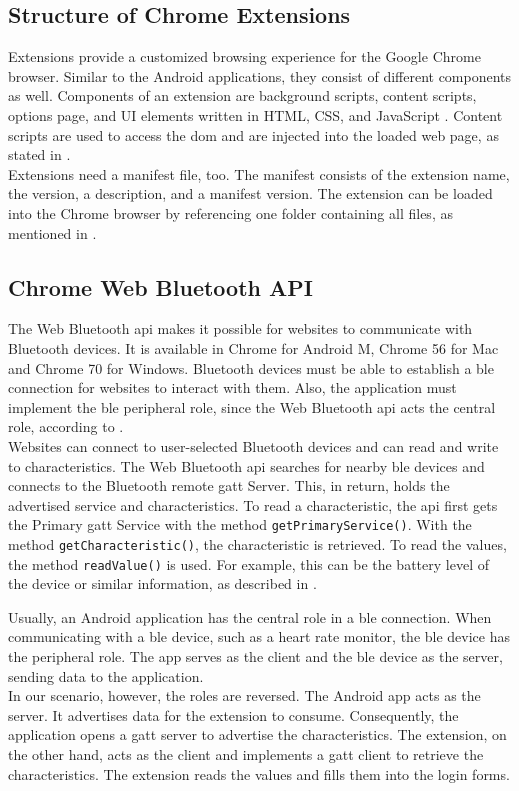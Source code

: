\subsection{Structure of Chrome Extensions}
Extensions provide a customized browsing experience for the Google Chrome browser. Similar to the Android applications, they consist of different components as well. Components of an extension are background scripts, content scripts, options page, and UI elements written in HTML, CSS, and JavaScript \cite{Extensions}. Content scripts are used to access the \gls{dom} and are injected into the loaded web page, as stated in \cite{LiuZYC12}. \\
Extensions need a manifest file, too. The manifest consists of the extension name, the version, a description, and a manifest version. The extension can be loaded into the Chrome browser by referencing one folder containing all files, as mentioned in \cite{Extensions}.


\subsection{Chrome Web Bluetooth API}
The Web Bluetooth \gls{api} makes it possible for websites to communicate with Bluetooth devices. It is available in Chrome for Android M, Chrome 56 for Mac and Chrome 70 for Windows. Bluetooth devices must be able to establish a \gls{ble} connection for websites to interact with them. Also, the application must implement the \gls{ble} peripheral role, since the Web Bluetooth \gls{api} acts the central role, according to \cite{BTAPIMozilla}. \\
Websites can connect to user-selected Bluetooth devices and can read and write to characteristics. The Web Bluetooth \gls{api} searches for nearby \gls{ble} devices and connects to the Bluetooth remote \gls{gatt} Server. This, in return, holds the advertised service and characteristics. To read a characteristic, the \gls{api} first gets the Primary \gls{gatt} Service with the method \texttt{getPrimaryService()}. With the method \texttt{getCharacteristic()}, the characteristic is retrieved. To read the values, the method \texttt{readValue()} is used. For example, this can be the battery level of the device or similar information, as described in \cite{WebBTAPI}.

Usually, an Android application has the central role in a \gls{ble} connection. When communicating with a \gls{ble} device, such as a heart rate monitor, the \gls{ble} device has the peripheral role. The app serves as the client and the \gls{ble} device as the server, sending data to the application. \\
In our scenario, however, the roles are reversed. The Android app acts as the server. It advertises data for the extension to consume. Consequently, the application opens a \gls{gatt} server to advertise the characteristics. The extension, on the other hand, acts as the client and implements a \gls{gatt} client to retrieve the characteristics. The extension reads the values and fills them into the login forms. \\